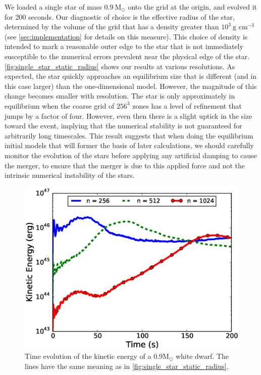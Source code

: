 \documentclass[iop]{../emulateapj}
\newcommand{\msolar}{\mathrm{M}_\odot}
\begin{document}
We loaded a single star of mass $0.9\ \msolar$ onto the grid at the origin, 
and evolved it for 200 seconds. Our diagnostic of choice is the effective 
radius of the star, determined by the volume of the grid that has a density 
greater than $10^3\ \text{g cm}^{-3}$ (see \autoref{sec:implementation} 
for details on this measure). This choice of density is intended to 
mark a reasonable outer edge to the star that is not immediately susceptible 
to the numerical errors prevalent near the physical edge of the star. 
\autoref{fig:single_star_static_radius} shows our results at various resolutions. 
As expected, the star quickly approaches an equilibrium size that is different 
(and in this case larger) than the one-dimensional model. However, the magnitude 
of this change becomes smaller with resolution. The star is only approximately 
in equilibrium when the coarse grid of $256^3$ zones has a level of 
refinement that jumps by a factor of four. However, even then there is a slight 
uptick in the size toward the event, implying that the numerical stability 
is not guaranteed for arbitrarily long timescales. This result suggests that when 
doing the equilibrium initial models that will former the basis of later calculations,
we should carefully monitor the evolution of the stars before applying any 
artificial damping to cause the merger, to ensure that the merger is due to 
this applied force and not the intrinsic numerical instability of the stars.

\begin{figure}
  \centering
  \includegraphics[scale=0.45]{plots/single_star_static_ke}
  \caption{Time evolution of the kinetic energy of a $0.9 \msolar$ 
    white dwarf. The lines have the same meaning as in \autoref{fig:single_star_static_radius}.
    \label{fig:single_star_static_ke}}
\end{figure}
\end{document}
